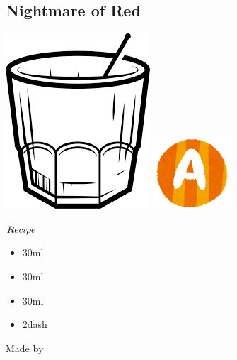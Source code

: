 \subsection{Nightmare of Red}
\vspace{-7.5mm}
\hspace{52mm}
\includegraphics[scale=.06]{cocktail_glass_rock.png}
\includegraphics[scale=.12]{capital_a.png}
\vspace{2.5mm}
\begin{itembox}[l]{\boldmath $Recipe$}
\begin{itemize}
\setlength{\parskip}{0cm}
\setlength{\itemsep}{0cm}
\item \gin 30ml
\item \campari 30ml
\item \pj 30ml
\item \ob 2dash
\end{itemize}
\vspace{-4mm}
Made by \stir
\end{itembox}

